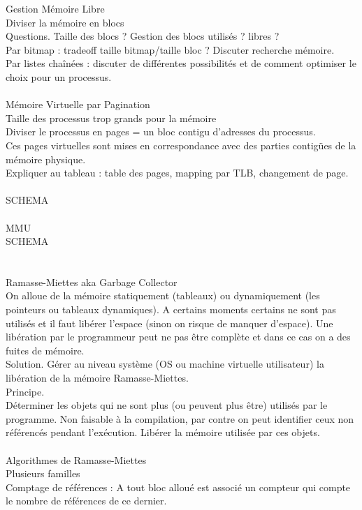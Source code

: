 \documentclass[5pt]{article}
\begin{document}
\begin{scriptsize}
Gestion Mémoire Libre\\
Diviser la mémoire en blocs\\
Questions. Taille des blocs ? Gestion des blocs utilisés ? libres ?\\
Par bitmap : tradeoff taille bitmap/taille bloc ? Discuter recherche mémoire.\\
Par listes chaînées : discuter de différentes possibilités et de comment optimiser le choix pour un processus.\\
\\
Mémoire Virtuelle par Pagination\\
Taille des processus trop grands pour la mémoire\\
Diviser le processus en pages = un bloc contigu d’adresses du processus.\\
Ces pages virtuelles sont mises en correspondance avec des parties contigües de la mémoire physique.\\
Expliquer au tableau : table des pages, mapping par TLB, changement de page.\\
\\SCHEMA\\
\\
MMU
\\SCHEMA\\
\\\\
Ramasse-Miettes aka Garbage Collector\\
On alloue de la mémoire statiquement (tableaux) ou dynamiquement (les pointeurs ou tableaux dynamiques). A certains moments certains ne sont pas utilisés et il faut libérer l’espace (sinon on risque de manquer d’espace). Une libération par le programmeur peut ne pas être complète et dans ce cas on a des fuites de mémoire.\\
Solution. Gérer au niveau système (OS ou machine virtuelle utilisateur) la libération de la mémoire Ramasse-Miettes.\\
Principe.\\
Déterminer les objets qui ne sont plus (ou peuvent plus être) utilisés par le programme. Non faisable à la compilation, par contre on peut identifier ceux non référencés pendant l’exécution. Libérer la mémoire utilisée par ces objets.\\
\\
Algorithmes de Ramasse-Miettes\\
Plusieurs familles\\
Comptage de références : A tout bloc alloué est associé un compteur qui compte le nombre de références de ce dernier.\\

\end{scriptsize}
\end{document}
